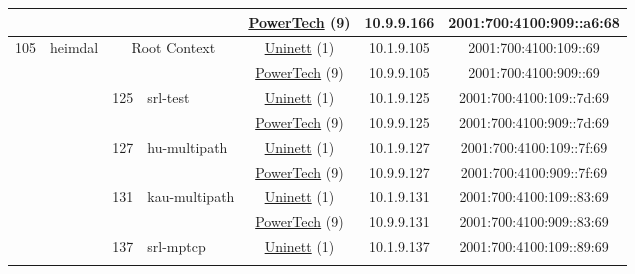 \begin{small}
\begin{center}
\begin{longtable}{|c|c|c|c|c|c|c|c|}
  &  &  &  & \multicolumn{2}{|c|}{\tiny{\href{http://www.powertech.no}{PowerTech} (9)}} & \tiny{10.9.9.166} & \tiny{2001:700:4100:909::a6:68} \\ \hline
 \multirow{18}{*}{\tiny{105}} & \multicolumn{1}{|l|}{\multirow{18}{*}{\tiny{heimdal}}} & \multicolumn{2}{|c|}{\multirow{2}{*}{\tiny{Root Context}}} & \multicolumn{2}{|c|}{\tiny{\href{https://www.uninett.no}{Uninett} (1)}} & \tiny{10.1.9.105} & \tiny{2001:700:4100:109::69} \\* \cline{5-5}\cline{6-6}\cline{7-7}\cline{8-8}
  &  & \multicolumn{2}{|c|}{} & \multicolumn{2}{|c|}{\tiny{\href{http://www.powertech.no}{PowerTech} (9)}} & \tiny{10.9.9.105} & \tiny{2001:700:4100:909::69} \\* \cline{3-3}\cline{4-4}\cline{5-5}\cline{6-6}\cline{7-7}\cline{8-8}
  &  & \multirow{2}{*}{\tiny{125}} & \multicolumn{1}{|l|}{\multirow{2}{*}{\tiny{srl-test}}} & \multicolumn{2}{|c|}{\tiny{\href{https://www.uninett.no}{Uninett} (1)}} & \tiny{10.1.9.125} & \tiny{2001:700:4100:109::7d:69} \\* \cline{5-5}\cline{6-6}\cline{7-7}\cline{8-8}
  &  &  &  & \multicolumn{2}{|c|}{\tiny{\href{http://www.powertech.no}{PowerTech} (9)}} & \tiny{10.9.9.125} & \tiny{2001:700:4100:909::7d:69} \\* \cline{3-3}\cline{4-4}\cline{5-5}\cline{6-6}\cline{7-7}\cline{8-8}
  &  & \multirow{2}{*}{\tiny{127}} & \multicolumn{1}{|l|}{\multirow{2}{*}{\tiny{hu-multipath}}} & \multicolumn{2}{|c|}{\tiny{\href{https://www.uninett.no}{Uninett} (1)}} & \tiny{10.1.9.127} & \tiny{2001:700:4100:109::7f:69} \\* \cline{5-5}\cline{6-6}\cline{7-7}\cline{8-8}
  &  &  &  & \multicolumn{2}{|c|}{\tiny{\href{http://www.powertech.no}{PowerTech} (9)}} & \tiny{10.9.9.127} & \tiny{2001:700:4100:909::7f:69} \\* \cline{3-3}\cline{4-4}\cline{5-5}\cline{6-6}\cline{7-7}\cline{8-8}
  &  & \multirow{2}{*}{\tiny{131}} & \multicolumn{1}{|l|}{\multirow{2}{*}{\tiny{kau-multipath}}} & \multicolumn{2}{|c|}{\tiny{\href{https://www.uninett.no}{Uninett} (1)}} & \tiny{10.1.9.131} & \tiny{2001:700:4100:109::83:69} \\* \cline{5-5}\cline{6-6}\cline{7-7}\cline{8-8}
  &  &  &  & \multicolumn{2}{|c|}{\tiny{\href{http://www.powertech.no}{PowerTech} (9)}} & \tiny{10.9.9.131} & \tiny{2001:700:4100:909::83:69} \\* \cline{3-3}\cline{4-4}\cline{5-5}\cline{6-6}\cline{7-7}\cline{8-8}
  &  & \multirow{2}{*}{\tiny{137}} & \multicolumn{1}{|l|}{\multirow{2}{*}{\tiny{srl-mptcp}}} & \multicolumn{2}{|c|}{\tiny{\href{https://www.uninett.no}{Uninett} (1)}} & \tiny{10.1.9.137} & \tiny{2001:700:4100:109::89:69} \\* \cline{5-5}\cline{6-6}\cline{7-7}\cline{8-8}

\end{longtable}
\end{center}
\end{small}

